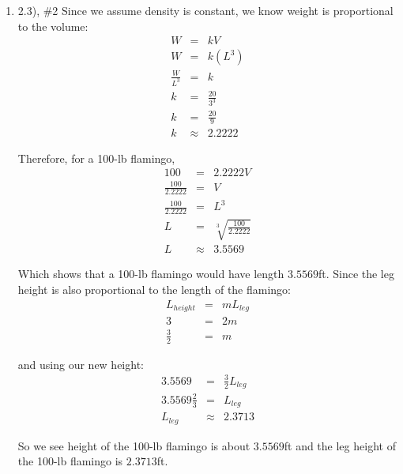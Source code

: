 \documentclass[12pt,letterpaper]{article}
\begin{document}
\begin{enumerate}
\item 2.3), \#2
Since we assume density is constant, we know weight is proportional to the volume: 
\begin{eqnarray*}
  W &=& kV\\
  W &=& k(L^3) \\
  \frac{W}{L^3} &=& k\\
  k &=& \frac{20}{3^3}\\
  k &=& \frac{20}{9}\\
  k &\approx& 2.2222
\end{eqnarray*}

Therefore, for a 100-lb flamingo, 
\begin{eqnarray*}
  100 &=& 2.2222V\\
  \frac{100}{2.2222} &=& V\\
  \frac{100}{2.2222} &=& L^3\\
  L &=& \sqrt[3]{\frac{100}{2.2222}}\\
  L &\approx& 3.5569
\end{eqnarray*}

Which shows that a 100-lb flamingo would have length $3.5569$ft. Since the leg height is 
also proportional to the length of the flamingo: 
\begin{eqnarray*}
  L_{height} &=& mL_{leg} \\
  3 &=& 2m \\
  \frac{3}{2} &=& m
\end{eqnarray*}

and using our new height: 
\begin{eqnarray*}
  3.5569 &=& \frac{3}{2}L_{leg}  \\
  3.5569 \frac{2}{3} &=& L_{leg} \\
  L_{leg} &\approx& 2.3713
\end{eqnarray*}

So we see height of the 100-lb flamingo is about $3.5569$ft and the leg height of the 
100-lb flamingo is $2.3713$ft. 
\end{enumerate}
\end{document}
